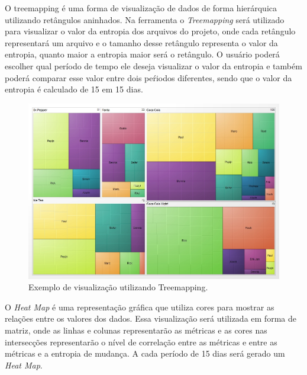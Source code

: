 O treemapping é uma forma de visualização de dados de forma hierárquica utilizando retângulos aninhados. Na ferramenta o \textit{Treemapping} será utilizado para visualizar o valor da entropia dos arquivos do projeto, onde cada retângulo representará um arquivo e o tamanho desse retângulo representa o valor da entropia, quanto maior a entropia maior será o retângulo. O usuário poderá escolher qual período de tempo ele deseja visualizar o valor da entropia e também poderá comparar esse valor entre dois peŕiodos diferentes, sendo que o valor da entropia é calculado de 15 em 15 dias.

\begin{figure}[H]
	\captionsetup{justification=centering}
	\centerline{\includegraphics[scale=0.2]{treemap.jpg}}
	\caption{Exemplo de visualização utilizando Treemapping.}
	\label{figura:visaometodo}
\end{figure}

O \textit{Heat Map} é uma representação gráfica que utiliza cores para mostrar as relações entre os valores dos dados. Essa visualização será utilizada em forma de matriz, onde as linhas e colunas representarão as métricas e as cores nas intersecções representarão o nível de correlação entre as métricas e entre as métricas e a entropia de mudança. A cada período de 15 dias será gerado um \textit{Heat Map}.

